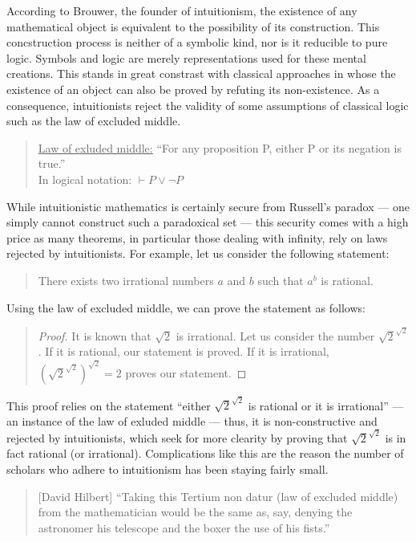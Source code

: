 \documentclass[hidelinks]{article}
\begin{document}
According to Brouwer, the founder of intuitionism, the existence of any mathematical object is equivalent to the possibility of its construction. 
This concstruction process is neither of a symbolic kind, nor is it reducible to pure logic. Symbols and logic are merely representations used for these mental creations. 
This stands in great constrast with classical approaches in whose the existence of an object can also be proved by refuting its non-existence. As a consequence, intuitionists reject the validity of some assumptions of classical logic such as the law of excluded middle.
\begin{quote}
\underline{Law of exluded middle:} ``For any proposition P, either P or its negation is true.''\\ 
In logical notation: $\vdash P\lor\lnot P$
\end{quote}
While intuitionistic mathematics is certainly secure from Russell's paradox --- one simply cannot construct such a paradoxical set --- this security comes with a high price as many theorems, in particular those dealing with infinity, rely on laws rejected by intuitionists. For example, let us consider the following statement:
\begin{quote}
There exists two irrational numbers $a$ and $b$ such that $a^b$ is rational.
\end{quote}
Using the law of excluded middle, we can prove the statement as follows:
\begin{quote}
\begin{proof}
	It is known that $\sqrt{2}$ is irrational. Let us consider the number $\sqrt{2}^{\sqrt{2}}$. If it is rational, our statement is proved. If it is irrational, $(\sqrt{2}^{\sqrt{2}})^{\sqrt{2}}=2$ proves our statement.
\end{proof}
\end{quote}
This proof relies on the statement ``either $\sqrt{2}^{\sqrt{2}}$ is rational or it is irrational'' --- an instance of the law of exluded middle --- thus, it is non-constructive and rejected by intuitionists, which seek for more clearity by proving that $\sqrt{2}^{\sqrt{2}}$ is in fact rational (or irrational). Complications like this are the reason the number of scholars who adhere to intuitionism has been staying fairly small.

\begin{quote}[David Hilbert]
``Taking this Tertium non datur (law of excluded middle) from the mathematician would be the same as, say, denying the astronomer his telescope and the boxer the use of his fists.''\cite{hilbert_tertium_non_datur}
\end{quote}
\end{document}
